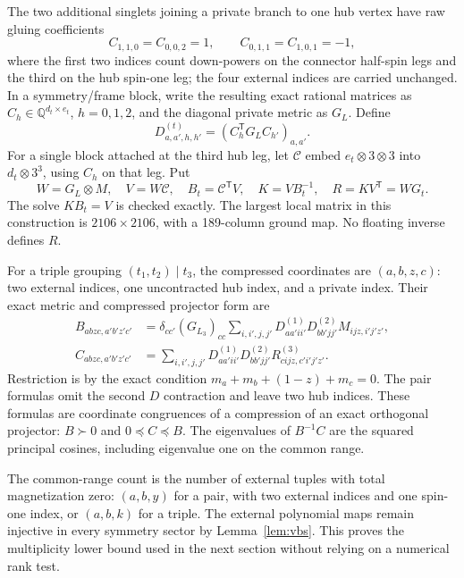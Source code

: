 \documentclass[11pt,a4paper]{article}
\theoremstyle{remark}\newtheorem{remark}[theorem]{Remark}
\begin{document}
The two additional singlets joining a private branch to one hub vertex have raw gluing coefficients
\[
 C_{1,1,0}=C_{0,0,2}=1,\qquad
 C_{0,1,1}=C_{1,0,1}=-1,
\]
where the first two indices count down-powers on the connector half-spin legs and the third on the hub spin-one leg; the four external indices are carried unchanged. In a symmetry/frame block, write the resulting exact rational matrices as $C_h\in\mathbb Q^{d_t\times e_t}$, $h=0,1,2$, and the diagonal private metric as $G_L$. Define
\begin{equation}\label{eq:channel}
 D^{(t)}_{a,a',h,h'}=(C_h^{\mathsf T}G_L C_{h'})_{a,a'}.
\end{equation}
For a single block attached at the third hub leg, let $\mathcal C$ embed $e_t\otimes3\otimes3$ into $d_t\otimes3^3$, using $C_h$ on that leg. Put
\begin{equation}\label{eq:localR}
 W=G_L\otimes M,\quad V=W\mathcal C,\quad B_t=\mathcal C^{\mathsf T}V,
 \quad K=VB_t^{-1},\quad R=KV^{\mathsf T}=WG_t.
\end{equation}
The solve $KB_t=V$ is checked exactly. The largest local matrix in this construction is $2106\times2106$, with a 189-column ground map. No floating inverse defines $R$.

For a triple grouping $(t_1,t_2)\mid t_3$, the compressed coordinates are $(a,b,z,c)$: two external indices, one uncontracted hub index, and a private index. Their exact metric and compressed projector form are
\begin{align}
 B_{abzc,a'b'z'c'}&=\delta_{cc'}(G_{L_3})_{cc}
 \sum_{i,i',j,j'}D^{(1)}_{aa'ii'}D^{(2)}_{bb'jj'}M_{ijz,i'j'z'},\label{eq:tripleB}\\
 C_{abzc,a'b'z'c'}&=
 \sum_{i,i',j,j'}D^{(1)}_{aa'ii'}D^{(2)}_{bb'jj'}
 R^{(3)}_{cijz,c'i'j'z'}.\label{eq:tripleC}
\end{align}
Restriction is by the exact condition $m_a+m_b+(1-z)+m_c=0$. The pair formulas omit the second $D$ contraction and leave two hub indices. These formulas are coordinate congruences of a compression of an exact orthogonal projector: $B\succ0$ and $0\preceq C\preceq B$. The eigenvalues of $B^{-1}C$ are the squared principal cosines, including eigenvalue one on the common range.

The common-range count is the number of external tuples with total magnetization zero: $(a,b,y)$ for a pair, with two external indices and one spin-one index, or $(a,b,k)$ for a triple. The external polynomial maps remain injective in every symmetry sector by Lemma~\ref{lem:vbs}. This proves the multiplicity lower bound used in the next section without relying on a numerical rank test.
\end{document}
